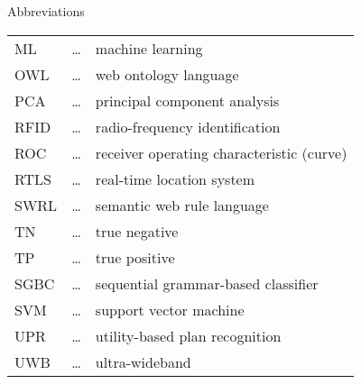\begin{preliminary}{Abbreviations}
\begin{tabular}{lcl}
ML			& \dots &	machine learning \\

OWL			& \dots &	web ontology language \\

PCA			& \dots & principal component analysis \\

RFID		& \dots & radio-frequency identification \\

ROC			& \dots & receiver operating characteristic (curve) \\

RTLS		& \dots & real-time location system \\

SWRL		& \dots & semantic web rule language \\

TN			& \dots &	true negative \\

TP			& \dots &	true positive \\

SGBC 		& \dots & sequential grammar-based classifier \\

SVM 		& \dots & support vector machine \\

UPR			& \dots & utility-based plan recognition \\

UWB			& \dots & ultra-wideband \\

\end{tabular}

\end{preliminary} 
